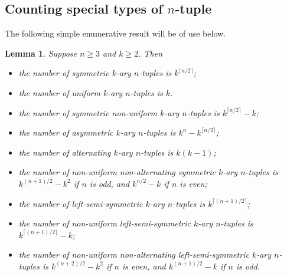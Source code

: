 \documentclass[a4paper,11pt]{article}
\newtheorem{lemma}{Lemma}[section]
\newtheorem{remark}[lemma]{Remark}
\begin{document}


\subsection{Counting special types of $n$-tuple}

The following simple enumerative result will be of use below.

\begin{lemma}  \label{lemma:tuple_numbers}
Suppose $n\geq3$ and $k\geq2$.  Then
\begin{itemize}
\item[i)] the number of symmetric $k$-ary $n$-tuples is $k^{\lceil n/2\rceil}$;
\item[ii)] the number of uniform $k$-ary $n$-tuples is $k$.
\item[iii)] the number of symmetric non-uniform $k$-ary $n$-tuples is $k^{\lceil n/2\rceil}-k$;
\item[iv)] the number of asymmetric $k$-ary $n$-tuples is $k^n-k^{\lceil n/2\rceil}$;
\item[v)] the number of alternating $k$-ary $n$-tuples is $k(k-1)$;
\item[vi)]  the number of non-uniform non-alternating symmetric $k$-ary $n$-tuples is
    $k^{(n+1)/2}-k^2$ if $n$ is odd, and $k^{n/2}-k$ if $n$ is even;
\item[vii)] the number of left-semi-symmetric $k$-ary $n$-tuples is $k^{\lceil(n+1)/2\rceil}$;
\item[viii)] the number of non-uniform left-semi-symmetric $k$-ary $n$-tuples is
    $k^{\lceil(n+1)/2\rceil}-k$;
\item[ix)] the number of non-uniform non-alternating left-semi-symmetric $k$-ary $n$-tuples is
    $k^{(n+2)/2}-k^2$ if $n$ is even, and $k^{(n+1)/2}-k$ if $n$ is odd.
\end{itemize}
\end{lemma}
\end{document}
